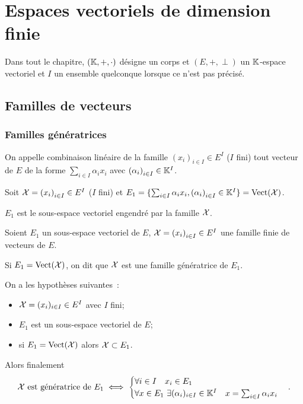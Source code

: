 \chapter{Espaces vectoriels de dimension finie}\label{chap:dimensionfinie}
\minitoc%
\minilof%
\minilot%

Dans tout le chapitre, \((\mathbb{K},+,\cdot)\) désigne un corps et \((E,+,\perp)\) un 
\(\mathbb{K}\)-espace vectoriel et \(I\) un ensemble quelconque lorsque ce n'est pas 
précisé.
\section{Familles de vecteurs}

\subsection{Familles génératrices}

\begin{defdef}
  On appelle combinaison linéaire de la famille \({(x_i)}_{i \in I} \in E^I\) 
  (\(I\) fini) tout vecteur de \(E\) de la forme \(\sum_{i \in I}\alpha_i x_i\) 
  avec \({(\alpha_i)}_{i\in I} \in \mathbb{K}^I\).

  Soit \(\mathcal{X}={(x_i)}_{i \in I} \in E^I\) (\(I\) fini) et \(E_1 = \{\sum_{i \in 
  I}\alpha_i x_i, {(\alpha_i)}_{i\in I} \in \mathbb{K}^I\}= \operatorname{Vect}(\mathcal{X})\).

  \(E_1\) est le sous-espace vectoriel engendré par la famille \(\mathcal{X}\).
\end{defdef}

\begin{defdef}
  Soient \(E_1\) un sous-espace vectoriel de \(E\), \(\mathcal{X} = {(x_i)}_{i \in I}\in 
  E^I\) une famille finie de vecteurs de \(E\). 

  Si \(E_1=\operatorname{Vect}(\mathcal{X})\), on dit que \(\mathcal{X}\) est une famille génératrice de 
  \(E_1\).
\end{defdef}
On a les hypothèses suivantes~:
\begin{itemize}
  \item \(\mathcal{X}=(x_i)_{i \in I} \in E^I\) avec \(I\) fini;
  \item \(E_1\) est un sous-espace vectoriel de \(E\);
  \item si \(E_1 = \operatorname{Vect}(\mathcal{X})\) alors \(\mathcal{X} \subset E_1\).
\end{itemize}
Alors finalement
\begin{equation}
  \mathcal{X} \text{~est génératrice de } E_1 \iff \begin{cases} \forall i \in I \quad 
  x_i \in E_1 \\ \forall x \in E_1 \ \exists (\alpha_i)_{i \in I} \in \mathbb{K}^I \quad 
  x=\sum_{i \in I} \alpha_i x_i \end{cases}.
\end{equation}

